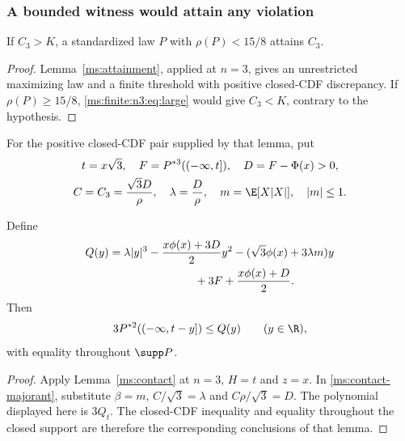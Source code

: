 \subsubsection{A bounded witness would attain any violation}
\begin{lemma}\label{ms:finite:n3:lem:attain}
If $C_3>K$, a standardized law $P$ with $\rho(P)<15/8$ attains $C_3$.
\end{lemma}
\begin{proof}
Lemma~\ref{ms:attainment}, applied at $n=3$, gives an unrestricted
maximizing law and a finite threshold with positive closed-CDF discrepancy. If
$\rho(P)\ge15/8$, \eqref{ms:finite:n3:eq:large} would give
$C_3<K$, contrary to the hypothesis.
\end{proof}
For the positive closed-CDF pair supplied by that lemma, put
\[
 \begin{gathered}
 t=x\sqrt3,\quad F=P^{*3}(( -\infty,t]),\quad D=F-\Phi(x)>0,\\
 C=C_3=\frac{\sqrt3D}{\rho},\quad \lambda=\frac D\rho,
 \quad m=\E[X|X|],\quad |m|\le1.
 \end{gathered}
\]

\begin{lemma}\label{ms:finite:n3:lem:contact}
Define
\begin{align}
 Q(y)={}&\lambda|y|^3-\frac{x\phi(x)+3D}{2}y^2
 -(\sqrt3\phi(x)+3\lambda m)y \notag\\
 &\hspace{22mm}+3F+\frac{x\phi(x)+D}{2}.
 \label{ms:finite:n3:eq:Q}
\end{align}
Then
\begin{equation}\label{ms:finite:n3:eq:contact}
 3P^{*2}(( -\infty,t-y])\le Q(y)\qquad(y\in\R),
\end{equation}
with equality throughout $\supp P$.
\end{lemma}
\begin{proof}
Apply Lemma~\ref{ms:contact} at $n=3$, $H=t$ and $z=x$.
In \eqref{ms:contact-majorant}, substitute $\beta=m$,
$C/\sqrt3=\lambda$ and $C\rho/\sqrt3=D$. The polynomial displayed
here is $3Q_t$. The closed-CDF inequality and equality throughout the
closed support are therefore the corresponding conclusions of that lemma.
\end{proof}

